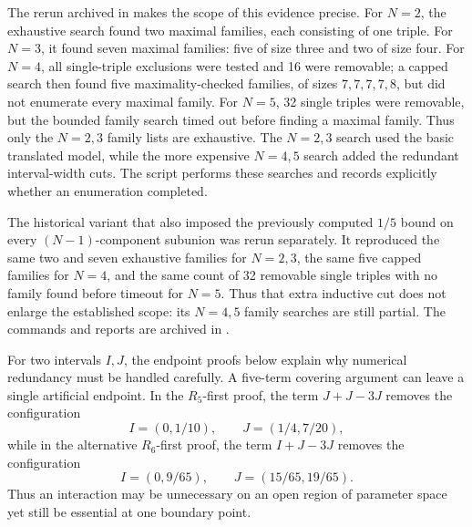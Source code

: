 The rerun archived in
 makes the
scope of this evidence precise.  For \(N=2\), the exhaustive search found two
maximal families, each consisting of one triple.  For \(N=3\), it found seven
maximal families: five of size three and two of size four.  For \(N=4\), all
single-triple exclusions were tested and 16 were removable; a capped search
then found five maximality-checked families, of sizes
\(7,7,7,7,8\), but did not enumerate every maximal family.  For \(N=5\), 32
single triples were removable, but the bounded family search timed out before
finding a maximal family.  Thus only the \(N=2,3\) family lists are exhaustive.
The \(N=2,3\) search used the basic translated model, while the more expensive
\(N=4,5\) search added the redundant interval-width cuts.
The script  performs these searches
and records explicitly whether an enumeration completed.

The historical variant that also imposed the previously computed \(1/5\)
bound on every \((N-1)\)-component subunion was rerun separately.  It
reproduced the same two and seven exhaustive families for \(N=2,3\), the same
five capped families for \(N=4\), and the same count of 32 removable single
triples with no family found before timeout for \(N=5\).  Thus that extra
inductive cut does not enlarge the established scope: its \(N=4,5\) family
searches are still partial.  The commands and reports are archived in
.

For two intervals \(I,J\), the endpoint proofs below explain why numerical
redundancy must be handled carefully.  A five-term covering argument can leave
a single artificial endpoint.  In the \(R_5\)-first proof, the term
\(J+J-3J\) removes the configuration
\[
    I=(0,1/10),\qquad J=(1/4,7/20),
\]
while in the alternative \(R_6\)-first proof, the term \(I+J-3J\) removes the
configuration
\[
    I=(0,9/65),\qquad J=(15/65,19/65).
\]
Thus an interaction may be unnecessary on an open region of parameter space
yet still be essential at one boundary point.
